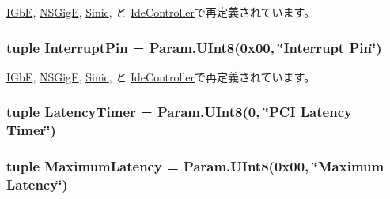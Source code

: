 \hyperlink{classEthernet_1_1IGbE_a4c885b3ef4f7d1a88903aabcce7a943e}{IGbE}, \hyperlink{classEthernet_1_1NSGigE_a4c885b3ef4f7d1a88903aabcce7a943e}{NSGigE}, \hyperlink{classEthernet_1_1Sinic_a4c885b3ef4f7d1a88903aabcce7a943e}{Sinic}, と \hyperlink{classIde_1_1IdeController_a4c885b3ef4f7d1a88903aabcce7a943e}{IdeController}で再定義されています。\hypertarget{classPci_1_1PciDevice_a5b633242454258f93682fd8b05d934a1}{
\subsubsection[{InterruptPin}]{\setlength{\rightskip}{0pt plus 5cm}tuple {\bf InterruptPin} = Param.UInt8(0x00, \char`\"{}Interrupt Pin\char`\"{})}}
\label{classPci_1_1PciDevice_a5b633242454258f93682fd8b05d934a1}


\hyperlink{classEthernet_1_1IGbE_a9b18e7e4ee8e0f835496c9106eb519d5}{IGbE}, \hyperlink{classEthernet_1_1NSGigE_a9b18e7e4ee8e0f835496c9106eb519d5}{NSGigE}, \hyperlink{classEthernet_1_1Sinic_a9b18e7e4ee8e0f835496c9106eb519d5}{Sinic}, と \hyperlink{classIde_1_1IdeController_a9b18e7e4ee8e0f835496c9106eb519d5}{IdeController}で再定義されています。\hypertarget{classPci_1_1PciDevice_af804bef2794d445f5c23651f77deccc3}{
\subsubsection[{LatencyTimer}]{\setlength{\rightskip}{0pt plus 5cm}tuple {\bf LatencyTimer} = Param.UInt8(0, \char`\"{}PCI {\bf Latency} Timer\char`\"{})}}
\label{classPci_1_1PciDevice_af804bef2794d445f5c23651f77deccc3}
\hypertarget{classPci_1_1PciDevice_a20752dfff7481059cf2d3887436800d1}{
\subsubsection[{MaximumLatency}]{\setlength{\rightskip}{0pt plus 5cm}tuple {\bf MaximumLatency} = Param.UInt8(0x00, \char`\"{}Maximum Latency\char`\"{})}}
\label{classPci_1_1PciDevice_a20752dfff7481059cf2d3887436800d1}


